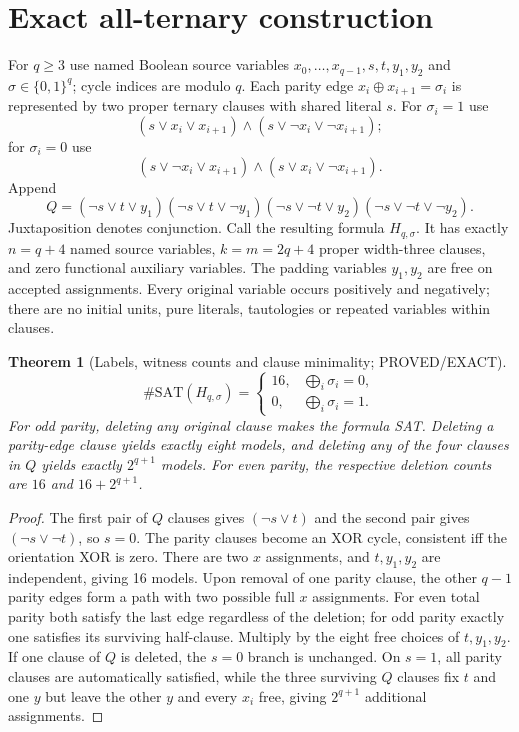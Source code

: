 \documentclass[11pt]{article}
\newtheorem{theorem}{Theorem}
\begin{document}
\section{Exact all-ternary construction}
For $q\ge3$ use named Boolean source variables $x_0,\ldots,x_{q-1},s,t,y_1,y_2$ and $\sigma\in\{0,1\}^q$; cycle indices are modulo $q$. Each parity edge $x_i\oplus x_{i+1}=\sigma_i$ is represented by two proper ternary clauses with shared literal $s$. For $\sigma_i=1$ use
\[
(s\vee x_i\vee x_{i+1})\wedge(s\vee\neg x_i\vee\neg x_{i+1});
\]
for $\sigma_i=0$ use
\[
(s\vee\neg x_i\vee x_{i+1})\wedge(s\vee x_i\vee\neg x_{i+1}).
\]
Append
\[
Q=(\neg s\vee t\vee y_1)(\neg s\vee t\vee\neg y_1)
(\neg s\vee\neg t\vee y_2)(\neg s\vee\neg t\vee\neg y_2).
\]
Juxtaposition denotes conjunction. Call the resulting formula $H_{q,\sigma}$. It has exactly $n=q+4$ named source variables, $k=m=2q+4$ proper width-three clauses, and zero functional auxiliary variables. The padding variables $y_1,y_2$ are free on accepted assignments. Every original variable occurs positively and negatively; there are no initial units, pure literals, tautologies or repeated variables within clauses.

\begin{theorem}[Labels, witness counts and clause minimality; PROVED/EXACT]
\[
\#\mathrm{SAT}(H_{q,\sigma})=
\begin{cases}16,&\bigoplus_i\sigma_i=0,\\0,&\bigoplus_i\sigma_i=1.\end{cases}
\]
For odd parity, deleting \emph{any} original clause makes the formula SAT. Deleting a parity-edge clause yields exactly eight models, and deleting any of the four clauses in $Q$ yields exactly $2^{q+1}$ models. For even parity, the respective deletion counts are $16$ and $16+2^{q+1}$.
\end{theorem}
\begin{proof}
The first pair of $Q$ clauses gives $(\neg s\vee t)$ and the second pair gives $(\neg s\vee\neg t)$, so $s=0$. The parity clauses become an XOR cycle, consistent iff the orientation XOR is zero. There are two $x$ assignments, and $t,y_1,y_2$ are independent, giving 16 models. Upon removal of one parity clause, the other $q-1$ parity edges form a path with two possible full $x$ assignments. For even total parity both satisfy the last edge regardless of the deletion; for odd parity exactly one satisfies its surviving half-clause. Multiply by the eight free choices of $t,y_1,y_2$. If one clause of $Q$ is deleted, the $s=0$ branch is unchanged. On $s=1$, all parity clauses are automatically satisfied, while the three surviving $Q$ clauses fix $t$ and one $y$ but leave the other $y$ and every $x_i$ free, giving $2^{q+1}$ additional assignments. \end{proof}
\end{document}
